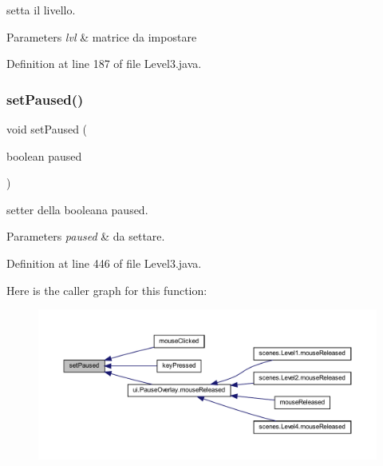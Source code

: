 setta il livello. 


\begin{DoxyParams}{Parameters}
{\em lvl} & matrice da impostare \\
\hline
\end{DoxyParams}


Definition at line 187 of file Level3.\+java.

\mbox{\label{classscenes_1_1_level3_aeab1551e3e372c6402076c04ea9002bb}} 
\subsubsection{\texorpdfstring{set\+Paused()}{setPaused()}}
{\footnotesize\ttfamily void set\+Paused (\begin{DoxyParamCaption}\item[{boolean}]{paused }\end{DoxyParamCaption})}



setter della booleana paused. 


\begin{DoxyParams}{Parameters}
{\em paused} & da settare. \\
\hline
\end{DoxyParams}


Definition at line 446 of file Level3.\+java.

Here is the caller graph for this function\+:\nopagebreak
\begin{figure}[H]
\begin{center}
\leavevmode
\includegraphics[width=350pt]{classscenes_1_1_level3_aeab1551e3e372c6402076c04ea9002bb_icgraph}
\end{center}
\end{figure}
\mbox{\label{classscenes_1_1_level3_ac9525f397417cae10d3de076f5b2e9d3}} 
